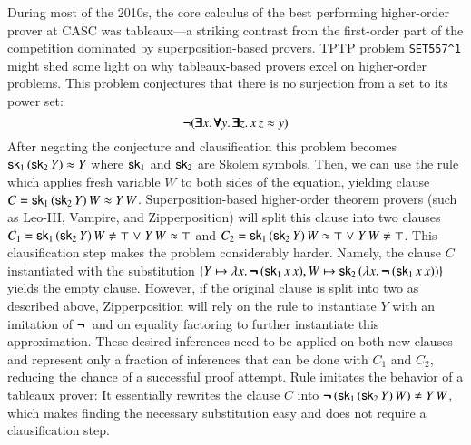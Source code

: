 During most of the 2010s, the core calculus of the best performing
higher-order prover at CASC was tableaux---a striking contrast from the first-order part
of the competition dominated by superposition-based provers. TPTP
problem \verb|SET557^1| might shed some light on why tableaux-based provers
excel on higher-order problems.
This problem conjectures that there is
no surjection from a set to its power set: 
$$ \neg (\pmb{\exists} x. \, \pmb{\forall} y. \,
\pmb{\exists} z. \, x \, z \approx y) $$ 
After negating the conjecture and
clausification this problem becomes $ \mathsf{sk}_1 \, (\mathsf{sk}_2 \, Y) \approx Y   $
where $\mathsf{sk}_1$ and $\mathsf{sk}_2$ are Skolem symbols. Then, we can use the
 rule \cite{bbtvw-21-sup-lam} which applies
fresh variable $W$ to both sides of the equation, yielding clause $ C = \mathsf{sk}_1 \, (\mathsf{sk}_2 \, Y) \, W
\approx Y \, W$. Superposition-based higher-order theorem
provers (such as Leo-III, Vampire, and Zipperposition) will split this clause
into two clauses $C_1 = \cst{sk}_1 \, (\cst{sk}_2 \, Y) \, W \not\eq \top \llor Y
\, W \eq \top $ and $ C_2 =  \cst{sk}_1 \, (\cst{sk}_2 \, Y) \, W \eq \top \llor
Y \, W \not\eq \top $. This clausification step makes the problem
considerably harder. Namely, the clause $C$ instantiated with the substitution $
\{ Y \mapsto \lambda x.\> \pmb{\neg\,} (\mathsf{sk}_1 \, x \, x), W \mapsto \mathsf{sk}_2 \,
(\lambda x.\> \pmb{\neg\,} (\mathsf{sk}_1 \, x \, x)) \} $ yields the empty clause. However,
if the original clause is split into two as described above, Zipperposition will
rely on the  rule to instantiate $Y$ with an imitation of $\pmb{\neg\,}$ and on
equality factoring to further instantiate this approximation. These desired
inferences need to be applied on both new clauses and represent only a fraction
of inferences that can be done with $C_1$ and $C_2$, reducing the chance of a
successful proof attempt. Rule  imitates the behavior of
a tableaux prover: It essentially rewrites the clause $C$ into $ \inot (\cst{sk}_1 \,
(\cst{sk}_2 \, Y) \, W) \not\eq Y \, W $, which makes finding the necessary substitution easy and
does not require a clausification step.

